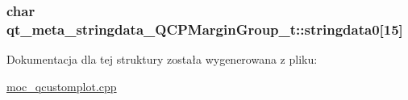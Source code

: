 \subsubsection[{\texorpdfstring{stringdata0}{stringdata0}}]{\setlength{\rightskip}{0pt plus 5cm}char qt\+\_\+meta\+\_\+stringdata\+\_\+\+Q\+C\+P\+Margin\+Group\+\_\+t\+::stringdata0\mbox{[}15\mbox{]}}\hypertarget{structqt__meta__stringdata___q_c_p_margin_group__t_aea2e8169d7b920f953fc3d240d03082b}{}\label{structqt__meta__stringdata___q_c_p_margin_group__t_aea2e8169d7b920f953fc3d240d03082b}


Dokumentacja dla tej struktury została wygenerowana z pliku\+:\begin{DoxyCompactItemize}
\item 
\hyperlink{moc__qcustomplot_8cpp}{moc\+\_\+qcustomplot.\+cpp}\end{DoxyCompactItemize}
